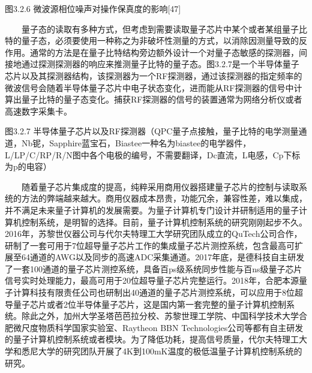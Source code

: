 \documentclass[a4paper,11pt,english]{sphinxmanual}
\begin{document}
\begin{center}图3.2.6 微波源相位噪声对操作保真度的影响{[}47{]}
\end{center}
\sphinxAtStartPar
  量子态的读取有多种方式，但考虑到需要读取量子芯片中某个或者某组量子比特的量子态，必须要使用一种称之为非破坏性测量的方式，以消除因测量导致的反作用。通常的方法是在量子比特结构旁边额外设计一个对量子态敏感的探测器，间接地通过探测探测器的响应来推测量子比特的量子态。图3.2.7是一个半导体量子芯片以及其探测器结构，该探测器为一个RF探测器，通过该探测器的指定频率的微波信号会随着半导体量子芯片中电子状态变化，进而能从RF探测器的信号中计算出量子比特的量子态变化。捕获RF探测器的信号的装置通常为网络分析仪或者高速数字采集卡。


\begin{center}图3.2.7 半导体量子芯片以及RF探测器（QPC\sphinxhyphen{}量子点接触，量子比特的电学测量通道，Nb\sphinxhyphen{}铌，Sapphire\sphinxhyphen{}蓝宝石，Bias\sphinxhyphen{}tee\sphinxhyphen{}一种名为bias\sphinxhyphen{}tee的电学器件，L/LP/C/RP/R/N\sphinxhyphen{}图中各个电极的编号，不需要翻译，Dc\sphinxhyphen{}直流，L\sphinxhyphen{}电感，Cp\sphinxhyphen{}下标为p的电容）
\end{center}
\sphinxAtStartPar
  随着量子芯片集成度的提高，纯粹采用商用仪器搭建量子芯片的控制与读取系统的方法的弊端越来越大。商用仪器成本昂贵，功能冗余，兼容性差，难以集成，并不满足未来量子计算机的发展需要。为量子计算机专门设计并研制适用的量子计算机控制系统，是明智的选择。目前，量子计算机控制系统的研究刚刚起步不久。2016年，苏黎世仪器公司与代尔夫特理工大学研究团队成立的QuTech公司合作，研制了一套可用于7位超导量子芯片工作的集成量子芯片测控系统，包含最高可扩展至64通道的AWG以及同步的高速ADC采集通道。2017年底，是德科技自主研发了一套100通道的量子芯片测控系统，具备百ps级系统同步性能与百ns级量子芯片信号实时处理能力，最高可用于20位超导量子芯片完整运行。2018年，合肥本源量子计算科技有限责任公司也研制出40通道的量子芯片测控系统，可以应用于8位超导量子芯片或者2位半导体量子芯片，这是国内第一套完整的量子计算机控制系统。除此之外，加州大学\sphinxhyphen{}圣塔芭芭拉分校、苏黎世理工学院、中国科学技术大学合肥微尺度物质科学国家实验室、Raytheon BBN Technologies公司等都有自主研发的量子计算机控制系统或者模块。为了降低功耗，提高信号质量，代尔夫特理工大学和悉尼大学的研究团队开展了4K到100mK温度的极低温量子计算机控制系统的研究。

\end{document}
